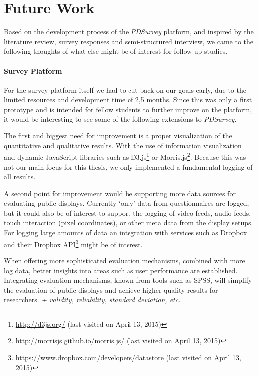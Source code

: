 \section{Future Work}
\label{chapter:future-work}

	
Based on the development process of the \textit{PDSurvey} platform, and inspired by the literature review, survey responses and semi-structured interview, we came to the following thoughts of what else might be of interest for follow-up studies.



\paragraph{Survey Platform}

For the survey platform itself we had to cut back on our goals early, due to the limited resources and development time of 2,5 months.
Since this was only a first prototype and is intended for fellow students to further improve on the platform, it would be interesting to see some of the following extensions to \textit{PDSurvey}.

	The first and biggest need for improvement is a proper visualization of the quantitative and qualitative results. With the use of information visualization and dynamic JavaScript libraries such as D3.js\footnote{\url{http://d3js.org/} (last visited on April 13, 2015)} or Morris.js\footnote{\url{http://morrisjs.github.io/morris.js/} (last visited on April 13, 2015)}. Because this was not our main focus for this thesis, we only implemented a fundamental logging of all results.

	A second point for improvement would be supporting more data sources for evaluating public displays. Currently `only' data from questionnaires are logged, but it could also be of interest to support the logging of video feeds, audio feeds, touch interaction (pixel coordinates), or other meta data from the display setups. For logging large amounts of data an integration with services such as Dropbox and their Dropbox API\footnote{\url{https://www.dropbox.com/developers/datastore} (last visited on April 13, 2015)} might be of interest.
		
	When offering more sophisticated evaluation mechanisms, combined with more log data, better insights into areas such as user performance are established. Integrating evaluation mechanisms, known from tools such as SPSS, will simplify the evaluation of public displays and achieve higher quality results for researchers. 
	\textit{+ validity, reliability, standard deviation, etc.}




